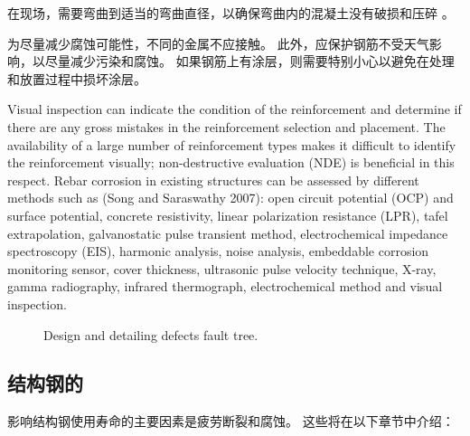 在现场，需要弯曲到适当的弯曲直径，以确保弯曲内的混凝土没有破损和压碎 \cite{aci2011b}。

为尽量减少腐蚀可能性，不同的金属不应接触。 此外，应保护钢筋不受天气影响，以尽量减少污染和腐蚀。 如果钢筋上有涂层，则需要特别小心以避免在处理和放置过程中损坏涂层。

Visual inspection can indicate the condition of the reinforcement and determine if there are any gross mistakes in the reinforcement selection and placement. The availability of a large number of reinforcement types makes it difficult to identify the reinforcement visually; non-destructive evaluation (NDE) is beneficial in this respect. Rebar corrosion in existing structures can be assessed by different methods such as (Song and Saraswathy 2007): open circuit potential (OCP) and surface potential, concrete resistivity, linear polarization resistance (LPR), tafel extrapolation, galvanostatic pulse transient method, electrochemical impedance spectroscopy (EIS), harmonic analysis, noise analysis, embeddable corrosion monitoring sensor, cover thickness, ultrasonic pulse velocity technique, X-ray, gamma radiography, infrared thermograph, electrochemical method and visual inspection.

\begin{figure}
  \caption{Design and detailing defects fault tree.}
  \label{fig:fault-tree-design-detailing}
\end{figure}

\subsection{结构钢的}
影响结构钢使用寿命的主要因素是疲劳断裂和腐蚀。 这些将在以下章节中介绍：

